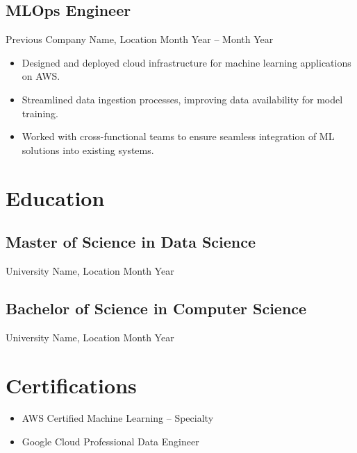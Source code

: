 \documentclass[a4paper,10pt]{article}
\begin{document}
\subsection*{MLOps Engineer}
Previous Company Name, Location \hfill Month Year -- Month Year
\begin{itemize}[leftmargin=*]
    \item Designed and deployed cloud infrastructure for machine learning applications on AWS.
    \item Streamlined data ingestion processes, improving data availability for model training.
    \item Worked with cross-functional teams to ensure seamless integration of ML solutions into existing systems.
\end{itemize}

\section*{Education}
\subsection*{Master of Science in Data Science}
University Name, Location \hfill Month Year

\subsection*{Bachelor of Science in Computer Science}
University Name, Location \hfill Month Year

\section*{Certifications}
\begin{itemize}[leftmargin=*]
    \item AWS Certified Machine Learning – Specialty
    \item Google Cloud Professional Data Engineer
\end{itemize}
\end{document}
